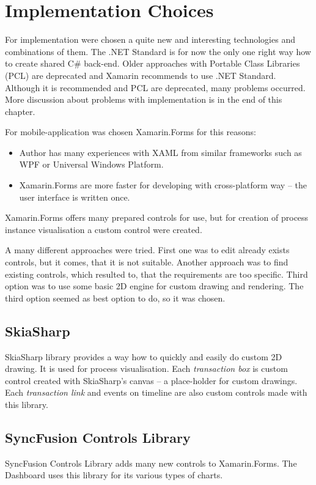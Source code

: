 \section{Implementation Choices}
For implementation were chosen a quite new and interesting technologies and combinations of them.
The .NET Standard is for now the only one right way how to create shared C\# back-end. Older approaches with Portable Class Libraries (PCL) are deprecated and Xamarin recommends to use .NET Standard. Although it is recommended and PCL are deprecated, many problems occurred. More discussion about problems with implementation is in the end of this chapter.

For mobile-application was chosen Xamarin.Forms for this reasons:
\begin{itemize}
\item Author has many experiences with XAML from similar frameworks such as WPF or Universal Windows Platform.
\item Xamarin.Forms are more faster for developing with cross-platform way -- the user interface is written once.
\end{itemize}

Xamarin.Forms offers many prepared controls for use, but for creation of process instance visualisation a custom control were created.  

A many different approaches were tried. First one was to edit already exists controls, but it comes, that it is not suitable. Another approach was to find existing controls, which resulted to, that the requirements are too specific. Third option was to use some basic 2D engine for custom drawing and rendering. The third option seemed as best option to do, so it was chosen. 
\subsection{SkiaSharp}
SkiaSharp library \cite{skiasharp} provides a way how to quickly and easily do custom 2D drawing. It is used for process visualisation. Each \textit{transaction box} is custom control created with SkiaSharp's canvas -- a place-holder for custom drawings. Each \textit{transaction link} and events on timeline are also custom controls made with this library. 
\subsection{SyncFusion Controls Library}
SyncFusion Controls Library  adds many new controls to Xamarin.Forms. The Dashboard uses this library for its various types of charts. 

